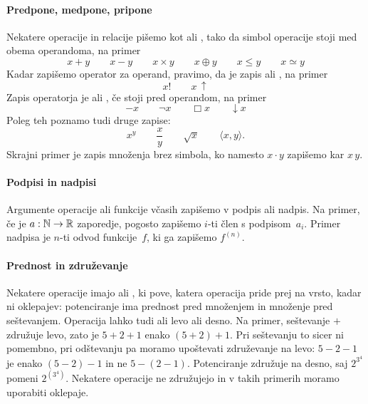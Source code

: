 \paragraph*{Predpone, medpone, pripone}

Nekatere operacije in relacije pišemo kot  ali , tako da simbol operacije stoji med obema operandoma, na primer
%
\begin{equation*}
  x + y \qquad
  x - y \qquad
  x \times y \qquad
  x \oplus y \qquad
  x \leq y \qquad
  x \simeq y
\end{equation*}
%
Kadar zapišemo operator za operand, pravimo, da je zapis  ali , na primer
%
\begin{equation*}
  x! \qquad 
  x\,{\uparrow}
\end{equation*}
%
Zapis operatorja je  ali , če stoji pred operandom, na primer
%
\begin{equation*}
  -x \qquad
  \neg x \qquad
  \Box x \qquad
  {\downarrow} x
\end{equation*}
%
Poleg teh poznamo tudi druge zapise:
%
\begin{equation*}
  x^y \qquad
  \frac{x}{y} \qquad
  \sqrt{x} \qquad
  \langle x, y \rangle.
\end{equation*}
%
Skrajni primer je zapis množenja brez simbola, ko namesto $x \cdot y$ zapišemo kar $x \, y$.


\paragraph*{Podpisi in nadpisi}

Argumente operacije ali funkcije včasih zapišemo v podpis ali nadpis.
%
Na primer, če je $a : \mathbb{N} \to \mathbb{R}$ zaporedje, pogosto zapišemo $i$-ti člen s podpisom~$a_i$.
%
Primer nadpisa je $n$-ti odvod funkcije~$f$, ki ga zapišemo $f^{(n)}$.


\paragraph*{Prednost in združevanje}

Nekatere operacije imajo  ali , ki pove, katera operacija pride prej na vrsto, kadar ni oklepajev:
potenciranje ima prednost pred množenjem in množenje pred seštevanjem.
%
Operacija lahko tudi  ali  levo ali desno.
%
Na primer, seštevanje $+$ združuje levo, zato je $5 + 2 + 1$
enako $(5 + 2) + 1$. Pri seštevanju to sicer ni pomembno, pri odštevanju pa moramo
upoštevati združevanje na levo: $5 - 2 - 1$ je enako $(5 - 2) - 1$ in ne $5 - (2 - 1)$.
Potenciranje združuje na desno, saj $2^{3^4}$ pomeni $2^{(3^4)}$. Nekatere operacije ne
združujejo in v takih primerih moramo uporabiti oklepaje.

